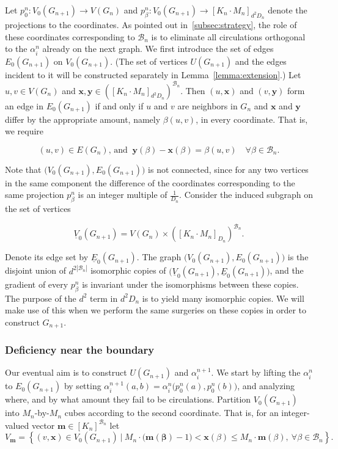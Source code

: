 \documentclass[10pt]{article}
\theoremstyle{plain}
\theoremstyle{remark}
\newcommand{\1}{\mathbbm{1}}
\numberwithin{equation}{section}
\begin{document}
Let $p^n_0$$: V_0(G_{n+1}) \to V(G_n)$ and $p^n_{\beta}: V_0(G_{n+1}) \to [K_n \cdot M_n]_{d^2D_n}$ denote the projections to the coordinates. As pointed out in~\ref{subsec:strategy}, the role of these coordinates corresponding to $\mathcal{B}_n$ is to eliminate all circulations orthogonal to the $\alpha_i^n$ already on the next graph. We first introduce the set of edges $E_0(G_{n+1})$ on $V_0(G_{n+1})$. (The set of vertices $U(G_{n+1})$ and the edges incident to it will be constructed separately in Lemma~\ref{lemma:extension}.) Let $u,v \in V(G_n)$ and $\mathbf{x}, \mathbf{y} \in \left([K_n\cdot M_n]_{d^2D_n}\right)^{\mathcal{B}_n}$. Then $(u,\mathbf{x})$ and $(v, \mathbf{y})$ form an edge in $E_0(G_{n+1})$ if and only if $u$ and $v$ are neighbors in $G_n$ and $\mathbf{x}$ and $\mathbf{y}$ differ by the appropriate amount, namely $\beta(u,v)$, in every coordinate. That is, we require 

\begin{equation} \label{eqn:edge_lift}
(u,v) \in E(G_n) \textrm{, and } \ \mathbf{y}(\beta)- \mathbf{x}(\beta) = \beta(u,v) \quad \forall \beta \in \mathcal{B}_n.
\end{equation}

Note that $\big(V_0(G_{n+1}),E_0(G_{n+1})\big)$ is not connected, since for any two vertices in the same component the difference of the coordinates corresponding to the same projection $p^n_{\beta}$ is an integer multiple of $\frac{1}{D_n}$. Consider the induced subgraph on the set of vertices

$$\underline{V}_0(G_{n+1})=V(G_n) \times \left([K_n \cdot M_n]_{D_n}\right)^{\mathcal{B}_n}.$$

Denote its edge set by $\underline{E}_0(G_{n+1})$. The graph $\big(V_0(G_{n+1}), E_0(G_{n+1})\big)$ is the disjoint union of $d^{2|\mathcal{B}_n|}$ isomorphic copies of $\big(\underline{V}_0(G_{n+1}), \underline{E}_0(G_{n+1})\big)$, and the gradient of every $p^n_{\beta}$ is invariant under the isomorphisms between these copies. The purpose of the $d^2$ term in $d^2D_n$ is to yield many isomorphic copies. We will make use of this when we perform the same surgeries on these copies in order to construct $G_{n+1}$.


\subsubsection{Deficiency near the boundary}
\label{subsubsec:ingredients}

Our eventual aim is to construct $U(G_{n+1})$ and $\alpha^{n+1}_i$. We start by lifting the $\alpha^n_i$ to $E_0(G_{n+1})$ by setting $\alpha^{n+1}_i(a,b) = \alpha^n_i\big(p_0^n(a), p_0^n(b)\big)$, and analyzing where, and by what amount they fail to be circulations.
Partition $V_0(G_{n+1})$ into $M_n$-by-$M_n$ cubes according to the second coordinate. That is, for an integer-valued vector $\mathbf{m} \in [K_n]^{\mathcal{B}_n}$ let \[V_{\mathbf{m}} = \left\{(v, \mathbf{x}) \in V_0(G_{n+1}) ~\Bigg|~ M_n\cdot \big(\mathbf{m(\beta)}-1 \big) <  \mathbf{x}(\beta) \leq M_n\cdot \mathbf{m}(\beta), \ \forall \beta \in \mathcal{B}_n\right\}.\] 
\end{document}
